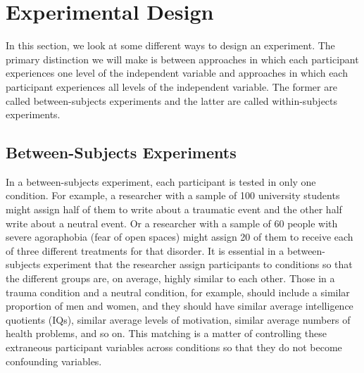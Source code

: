 \newpage
\section{Experimental Design}  




In this section, we look at some different ways to design an experiment. The primary distinction we will make is between approaches in which each participant experiences one level of the independent variable and approaches in which each participant experiences all levels of the independent variable. The former are called between-subjects experiments and the latter are called within-subjects experiments.

\subsection{Between-Subjects Experiments}

In a between-subjects experiment, each participant is tested in only one condition. For example, a researcher with a sample of 100 university students might assign half of them to write about a traumatic event and the other half write about a neutral event. Or a researcher with a sample of 60 people with severe agoraphobia (fear of open spaces) might assign 20 of them to receive each of three different treatments for that disorder. It is essential in a between- subjects experiment that the researcher assign participants to conditions so that the different groups are, on average, highly similar to each other. Those in a trauma condition and a neutral condition, for example, should include a similar proportion of men and women, and they should have similar average intelligence quotients (IQs), similar average levels of motivation, similar average numbers of health problems, and so on. This matching is a matter of controlling these extraneous participant variables across conditions so that they do not become confounding variables.


